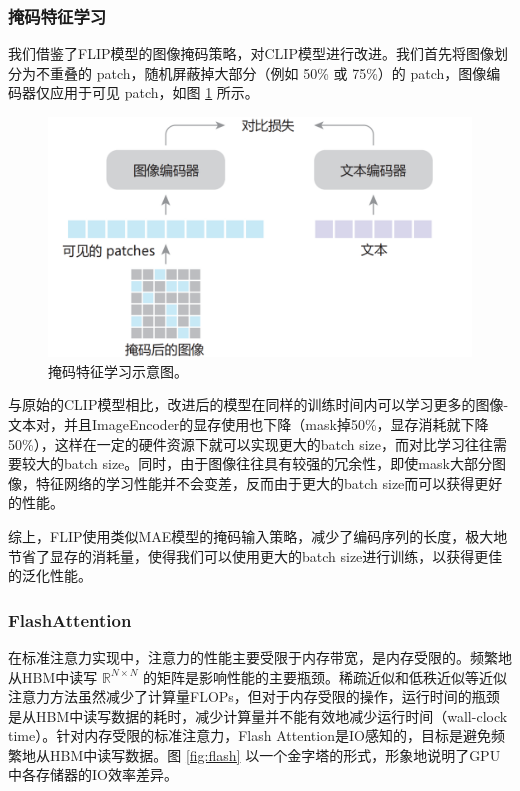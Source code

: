 \documentclass[a4paper]{zreport}
\begin{document}
\subsubsection{掩码特征学习}

我们借鉴了FLIP模型的图像掩码策略，对CLIP模型进行改进。我们首先将图像划分为不重叠的 patch，随机屏蔽掉大部分（例如 50\% 或 75\%）的 patch，图像编码器仅应用于可见 patch，如图 \ref{fig:mask} 所示。


\begin{figure}[h]
\centering
\includegraphics[width=0.95\linewidth]{figures/mask}
\caption{掩码特征学习示意图。}
\label{fig:mask}
\end{figure}

与原始的CLIP模型相比，改进后的模型在同样的训练时间内可以学习更多的图像-文本对，并且ImageEncoder的显存使用也下降（mask掉50\%，显存消耗就下降50\%），这样在一定的硬件资源下就可以实现更大的batch size，而对比学习往往需要较大的batch size。同时，由于图像往往具有较强的冗余性，即使mask大部分图像，特征网络的学习性能并不会变差，反而由于更大的batch size而可以获得更好的性能。

综上，FLIP使用类似MAE模型的掩码输入策略，减少了编码序列的长度，极大地节省了显存的消耗量，使得我们可以使用更大的batch size进行训练，以获得更佳的泛化性能。


\subsubsection{FlashAttention}

在标准注意力实现中，注意力的性能主要受限于内存带宽，是内存受限的。频繁地从HBM中读写 $\mathbb{R}^{N \times N}$ 的矩阵是影响性能的主要瓶颈。稀疏近似和低秩近似等近似注意力方法虽然减少了计算量FLOPs，但对于内存受限的操作，运行时间的瓶颈是从HBM中读写数据的耗时，减少计算量并不能有效地减少运行时间（wall-clock time）。针对内存受限的标准注意力，Flash Attention是IO感知的，目标是避免频繁地从HBM中读写数据。图 \ref{fig:flash} 以一个金字塔的形式，形象地说明了GPU中各存储器的IO效率差异。
\end{document}
